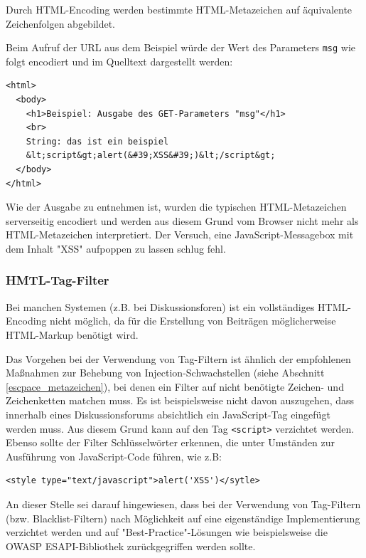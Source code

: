 Durch HTML-Encoding \cite{character_encoding}
werden bestimmte HTML-Metazeichen auf äquivalente Zeichenfolgen abgebildet.

Beim Aufruf der URL aus dem Beispiel würde der Wert des Parameters 
\texttt{msg} wie folgt encodiert und im Quelltext dargestellt werden:

\begin{lstlisting}[basicstyle=\ttfamily\footnotesize]
<html>
  <body>
    <h1>Beispiel: Ausgabe des GET-Parameters "msg"</h1>
    <br>
    String: das ist ein beispiel
    &lt;script&gt;alert(&#39;XSS&#39;)&lt;/script&gt;
  </body>
</html>
\end{lstlisting}

Wie der Ausgabe zu entnehmen ist, wurden die typischen HTML-Metazeichen 
serverseitig encodiert und werden aus diesem Grund vom Browser nicht 
mehr als HTML-Metazeichen interpretiert. Der Versuch, eine JavaScript-Messagebox 
mit dem Inhalt "XSS" aufpoppen zu lassen schlug fehl.

\subsubsection{HMTL-Tag-Filter}

Bei manchen Systemen (z.B. bei Diskussionsforen) ist ein vollständiges 
HTML-Encoding nicht möglich, da für die Erstellung von Beiträgen 
möglicherweise HTML-Markup benötigt wird. 

Das Vorgehen bei der Verwendung von Tag-Filtern ist ähnlich der 
empfohlenen Maßnahmen zur Behebung von Injection-Schwachstellen 
(siehe Abschnitt \ref{escpace_metazeichen}), bei denen ein Filter auf 
nicht benötigte Zeichen- und Zeichenketten matchen muss. Es ist 
beispielsweise nicht davon auszugehen, dass innerhalb eines 
Diskussionsforums absichtlich ein JavaScript-Tag eingefügt werden 
muss. Aus diesem Grund kann auf den Tag \texttt{<script>} verzichtet 
werden. Ebenso sollte der Filter Schlüsselwörter erkennen, die unter 
Umständen zur Ausführung von JavaScript-Code führen, wie z.B:

\begin{lstlisting}[basicstyle=\ttfamily\footnotesize]
<style type="text/javascript">alert('XSS')</sytle>
\end{lstlisting}

An dieser Stelle sei darauf hingewiesen, dass bei der Verwendung von 
Tag-Filtern (bzw. Blacklist-Filtern) nach Möglichkeit auf eine 
eigenständige Implementierung verzichtet werden und auf 
"Best-Practice"-Lösungen wie beispielsweise die OWASP 
ESAPI-Bibliothek zurückgegriffen werden sollte.

